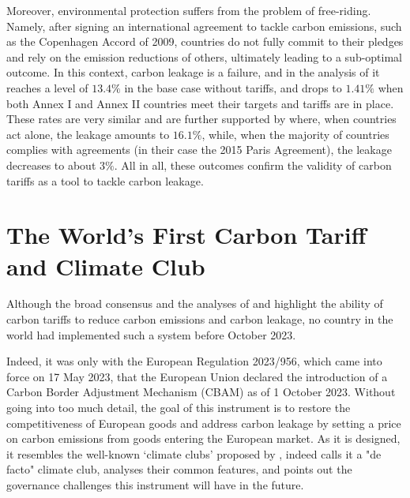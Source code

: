 Moreover, environmental protection suffers from the problem of free-riding. Namely, after signing an international agreement to tackle carbon emissions, such as the Copenhagen Accord of 2009, countries do not fully commit to their pledges and rely on the emission reductions of others, ultimately leading to a sub-optimal outcome. In this context, carbon leakage is a failure, and in the analysis of \textcite{Larch2017} it reaches a level of $13.4\%$ in the base case without tariffs, and drops to $1.41\%$ when both Annex I and Annex II countries meet their targets and tariffs are in place. These rates are very similar and are further supported by \textcite{King2021} where, when countries act alone, the leakage amounts to $16.1\%$, while, when the majority of countries complies with agreements (in their case the 2015 Paris Agreement), the leakage decreases to about $3\%$. All in all, these outcomes confirm the validity of carbon tariffs as a tool to tackle carbon leakage.

\section{The World's First Carbon Tariff and Climate Club}

Although the broad consensus and the analyses of \textcite{Larch2017} and \textcite{King2021} highlight the ability of carbon tariffs to reduce carbon emissions and carbon leakage, no country in the world had implemented such a system before October 2023.

Indeed, it was only with the European Regulation 2023/956, which came into force on 17 May 2023, that the European Union declared the introduction of a Carbon Border Adjustment Mechanism (CBAM) as of 1 October 2023. Without going into too much detail, the goal of this instrument is to restore the competitiveness of European goods and address carbon leakage by setting a price on carbon emissions from goods entering the European market. As it is designed, it resembles the well-known ‘climate clubs’ proposed by \textcite{Nordhaus2015}, indeed \textcite{Szulecki2022} calls it a "de facto" climate club, analyses their common features, and points out the governance challenges this instrument will have in the future.

